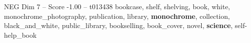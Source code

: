 \begin{textsample}{NEG Dim 7 – Score -1.00 – t013438}  \label{ex:f7_neg_020}
bookcase, shelf, shelving, book, white, monochrome\_photography, publication, library, \textbf{monochrome}, collection, black\_and\_white, public\_library, bookselling, book\_cover, novel, \textbf{science}, self-help\_book

\end{textsample}
